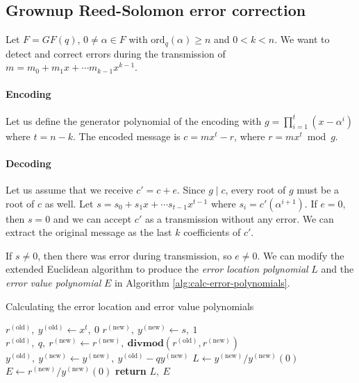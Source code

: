 \documentclass{article}
\newcommand*{\divmod}[2]{\mathbf{divmod}\left( #1, #2 \right)}
\begin{document}
\subsection{Grownup Reed-Solomon error correction}

Let $F=GF(q)$, $0 \neq \alpha \in F$ with $\mathrm{ord}_q(\alpha) \ge n$ and $0 < k < n$.
We want to detect and correct errors during the transmission of $m=m_0 + m_1 x + \cdots m_{k-1} x^{k-1}$.

\paragraph{Encoding}
Let us define the generator polynomial of the encoding with $g = \prod_{i=1}^t \left( x - \alpha^i \right)$ where $t=n-k$.
The encoded message is $c = mx^t - r$, where $r = mx^t \bmod g$.

\paragraph{Decoding}
Let us assume that we receive $c' = c + e$.
Since $g \mid c$, every root of $g$ must be a root of $c$ as well.
Let $s = s_0 + s_1x + \cdots s_{t-1}x^{t-1}$ where $s_i = c'(\alpha^{i+1})$.
If $e=0$, then $s=0$ and we can accept $c'$ as a transmission without any error.
We can extract the original message as the last $k$ coefficients of $c'$.

If $s \neq 0$, then there was error during transmission, so $e \neq 0$.
We can modify the extended Euclidean algorithm to produce the \emph{error location polynomial} $L$ and the \emph{error value polynomial} $E$ in Algorithm \ref{alg:calc-error-polynomials}.

\begin{algorithm}
    \caption{Calculating the error location and error value polynomials}
    \label{alg:calc-error-polynomials}
    \begin{algorithmic}[1]
            \State $r^{(\mathrm{old})},\ y^{(\mathrm{old})} \gets x^t,\ 0$
            \State $r^{(\mathrm{new})},\ y^{(\mathrm{new})} \gets s,\ 1$
                \State $r^{(\mathrm{old})},\ q,\ r^{(\mathrm{new})} \gets r^{(\mathrm{new})},\ \divmod{r^{(\mathrm{old})}}{r^{(\mathrm{new})}}$
                \State $y^{(\mathrm{old})},\ y^{(\mathrm{new})} \gets y^{(\mathrm{new})},\ y^{(\mathrm{old})} - q y^{(\mathrm{new})}$
            \EndWhile
            \State $L \gets y^{(\mathrm{new})}/y^{(\mathrm{new})}(0)$
            \State $E \gets r^{(\mathrm{new})}/y^{(\mathrm{new})}(0)$
            \State \textbf{return} $L,\ E$
        \EndProcedure
    \end{algorithmic}
\end{algorithm}
\end{document}
